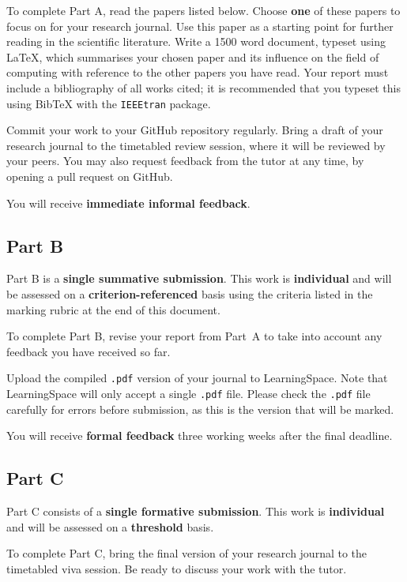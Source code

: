\documentclass{../../fal_assignment}
\begin{document}
To complete Part A, read the papers listed below.
Choose \textbf{one} of these papers to focus on for your research journal.
Use this paper as a starting point for further reading in the scientific literature.
Write a 1500 word document, typeset using LaTeX,
which summarises your chosen paper and its influence on the field of computing
with reference to the other papers you have read.
Your report must include a bibliography of all works cited;
it is recommended that you typeset this using BibTeX with the \texttt{IEEEtran} package.

Commit your work to your GitHub repository regularly.
Bring a draft of your research journal to the timetabled review session,
where it will be reviewed by your peers.
You may also request feedback from the tutor at any time,
by opening a pull request on GitHub.

You will receive \textbf{immediate informal feedback}.

\subsection*{Part B}

Part B is a \textbf{single summative submission}. This work is \textbf{individual} and will be assessed on a \textbf{criterion-referenced} basis
using the criteria listed in the marking rubric at the end of this document.

To complete Part B, revise your report from Part~A to take into account any feedback you have received so far.

Upload the compiled \texttt{.pdf} version of your journal to LearningSpace.
Note that LearningSpace will only accept a single \texttt{.pdf} file.
Please check the \texttt{.pdf} file carefully for errors before submission, as this is the version that will be marked.

You will receive \textbf{formal feedback} three working weeks after the final deadline.

\subsection*{Part C}

Part C consists of a \textbf{single formative submission}. This work is \textbf{individual} and will be assessed on a \textbf{threshold} basis.

To complete Part C, bring the final version of your research journal to the timetabled viva session.
Be ready to discuss your work with the tutor.
\end{document}
